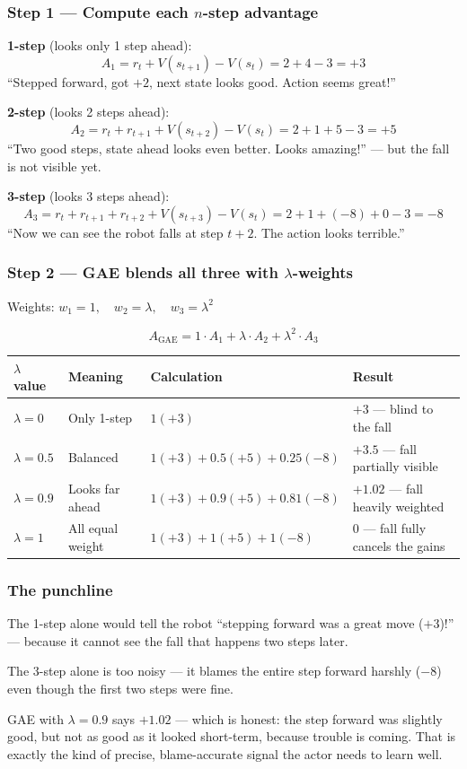 \subsubsection*{Step 1 --- Compute each $n$-step advantage}

\textbf{1-step} (looks only 1 step ahead):
\[
A_1 = r_t + V(s_{t+1}) - V(s_t) = 2 + 4 - 3 = +3
\]
``Stepped forward, got $+2$, next state looks good. Action seems great!''

\textbf{2-step} (looks 2 steps ahead):
\[
A_2 = r_t + r_{t+1} + V(s_{t+2}) - V(s_t) = 2 + 1 + 5 - 3 = +5
\]
``Two good steps, state ahead looks even better. Looks amazing!'' --- but the fall is not visible yet.

\textbf{3-step} (looks 3 steps ahead):
\[
A_3 = r_t + r_{t+1} + r_{t+2} + V(s_{t+3}) - V(s_t) = 2 + 1 + (-8) + 0 - 3 = -8
\]
``Now we can see the robot falls at step $t+2$. The action looks terrible.''

\subsubsection*{Step 2 --- GAE blends all three with $\lambda$-weights}

Weights: $w_1 = 1,\quad w_2 = \lambda,\quad w_3 = \lambda^2$

\[
A_\mathrm{GAE} = 1 \cdot A_1 + \lambda \cdot A_2 + \lambda^2 \cdot A_3
\]

\begin{center}
\begin{tabular}{llll}
\hline
$\lambda$ value & Meaning & Calculation & Result \\
\hline
$\lambda = 0$ & Only 1-step & $1(+3)$ & $+3$ --- blind to the fall \\
$\lambda = 0.5$ & Balanced & $1(+3) + 0.5(+5) + 0.25(-8)$ & $+3.5$ --- fall partially visible \\
$\lambda = 0.9$ & Looks far ahead & $1(+3) + 0.9(+5) + 0.81(-8)$ & $+1.02$ --- fall heavily weighted \\
$\lambda = 1$ & All equal weight & $1(+3) + 1(+5) + 1(-8)$ & $0$ --- fall fully cancels the gains \\
\hline
\end{tabular}
\end{center}

\subsubsection*{The punchline}

The 1-step alone would tell the robot ``stepping forward was a great move ($+3$)!'' --- because it cannot see the fall that happens two steps later.

The 3-step alone is too noisy --- it blames the entire step forward harshly ($-8$) even though the first two steps were fine.

GAE with $\lambda = 0.9$ says $+1.02$ --- which is honest: the step forward was slightly good, but not as good as it looked short-term, because trouble is coming. That is exactly the kind of precise, blame-accurate signal the actor needs to learn well.